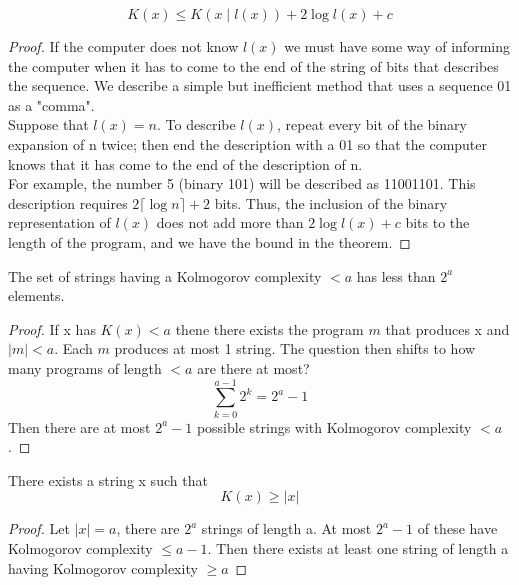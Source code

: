     \begin{theorem}
        \[ 
            K(x)\leq K(x\mid l(x)) + 2\log{l(x)}+c 
        \]
        \begin{proof}
            If the computer does not know $l(x)$ we must have some way of informing the computer when it has to come to the end of the string of bits that describes the sequence. We describe a simple but inefficient method that uses a sequence 01 as a "comma".\\
            Suppose that $l(x) = n$. To describe $l(x)$, repeat every bit of the binary expansion of n twice; then end the description with a 01 so that the computer knows that it has come to the end of the description of n.\\For example, the number 5 (binary 101) will be described as 11001101. This description requires $ 2 \lceil \log{n} \rceil +2 $ bits. Thus, the inclusion of the binary representation of $l(x)$ does not add more than $2\log{l(x)}+c$ bits to the length of the program, and we have the bound in the theorem.
        \end{proof}
    \end{theorem}

    \begin{lemma}
        The set of strings having a Kolmogorov complexity $<a$ has less than $2^a$ elements.
        \begin{proof}
            If x has $K(x) < a$ thene there exists the program $m$ that produces x and $|m|<a$. Each $m$ produces at most 1 string. The question then shifts to how many programs of length $<a$ are there at most?
            \[ 
                 \sum_{k=0}^{a-1}{2^k} = 2^a -1
            \]
            Then there are at most $2^a-1$ possible strings with Kolmogorov complexity $<a$.
        \end{proof}
    \end{lemma}

    \begin{theorem}
        There exists a string x such that
        \[ 
            K(x) \geq |x| 
        \]
        \begin{proof}
            Let $|x|=a$, there are $2^a$ strings of length a. At most $2^a-1$ of these have Kolmogorov complexity $\leq a-1$. Then there exists at least one string of length a having Kolmogorov complexity $\geq a$
        \end{proof}
    \end{theorem}
    
